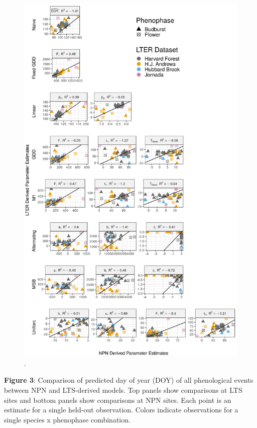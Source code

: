 \documentclass[fleqn,12pt,lineno]{wlpeerj} %
\begin{document}
\begin{figure}[H]
	\centering
		\includegraphics[width=1\textwidth]{figure_param_comparison.png}
    \caption{.}
\end{figure}


\newpage

\textbf{Figure 3}: Comparison of predicted day of year (DOY) of all phenological events between NPN and LTS-derived models. Top panels show comparisons at LTS sites and bottom panels show comparisons at NPN sites. Each point is an estimate for a single held-out observation. Colors indicate observations for a single species x phenophase combination.
\end{document}
